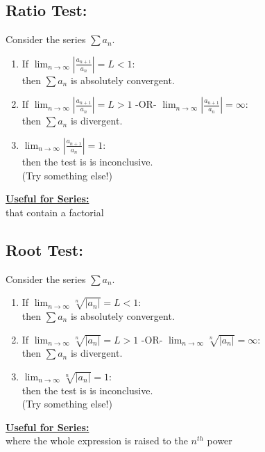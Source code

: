 \documentclass[10pt]{article}
\begin{document}
\subsection*{Ratio Test:}
Consider the series \(\sum a_n\). 
 \begin{enumerate}
 \item If \(\lim_{n\rightarrow \infty} \left| \frac{a_{n+1}}{a_n}\right| = L < 1\):\\
  then \(\sum a_n\) is absolutely convergent.\\ 
  \item If \(\lim_{n\rightarrow \infty} \left| \frac{a_{n+1}}{a_n}\right| = L > 1\)
  -OR- 
  \(\lim_{n\rightarrow \infty} \left| \frac{a_{n+1}}{a_n}\right| =\infty\):\\
   then \(\sum a_n\) is divergent.\\
\item \(\lim_{n\rightarrow \infty} \left| \frac{a_{n+1}}{a_n}\right| = 1\):\\
 then the test is is inconclusive.\\
  (Try something else!)
 \end{enumerate} 
 \underline{\textbf{Useful for Series:}}\\
 that contain a factorial
 
\subsection*{Root Test:}
Consider the series \(\sum a_n\). 
 \begin{enumerate}
 \item If \(\lim_{n\rightarrow \infty} \sqrt[n]{|a_n|}= L < 1\):\\
  then \(\sum a_n\) is absolutely convergent. %
  \item If \(\lim_{n\rightarrow \infty} \sqrt[n]{|a_n|} = L > 1\)
  -OR- 
  \(\lim_{n\rightarrow \infty} \sqrt[n]{|a_n|}=\infty\):\\
   then \(\sum a_n\) is divergent.  %
\item \(\lim_{n\rightarrow \infty} \sqrt[n]{|a_n|} = 1\):\\
 then the test is is inconclusive.\\
  (Try something else!)
 \end{enumerate} 
  \underline{\textbf{Useful for Series:}}\\
 where the whole expression is raised to the  \(n^{th}\) power
\end{document}
